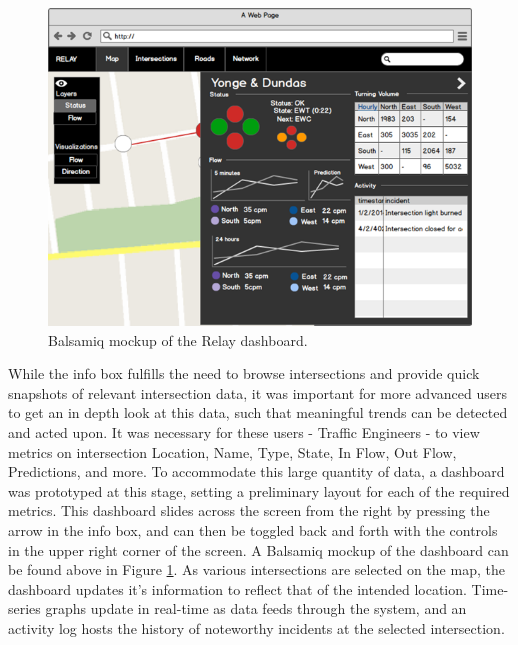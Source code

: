 \documentclass{report}
\begin{document}
\begin{figure}[htbp!]
  \begin{centering}
    \includegraphics[scale=0.6]{figures/bals-3.png}
    \caption{Balsamiq mockup of the Relay dashboard.}
    \label{fig:bals-3}
  \end{centering}
\end{figure}

While the info box fulfills the need to browse intersections and provide quick snapshots of relevant intersection data, it was important for more advanced users to get an in depth look at this data, such that meaningful trends can be detected and acted upon.
It was necessary for these users - Traffic Engineers - to view metrics on intersection Location, Name, Type, State, In Flow, Out Flow, Predictions, and more.
To accommodate this large quantity of data, a dashboard was prototyped at this stage, setting a preliminary layout for each of the required metrics.
This dashboard slides across the screen from the right by pressing the arrow in the info box, and can then be toggled back and forth with the controls in the upper right corner of the screen.
A Balsamiq mockup of the dashboard can be found above in Figure \ref{fig:bals-3}.
As various intersections are selected on the map, the dashboard updates it's information to reflect that of the intended location.
Time-series graphs update in real-time as data feeds through the system, and an activity log hosts the history of noteworthy incidents at the selected intersection.
\end{document}
